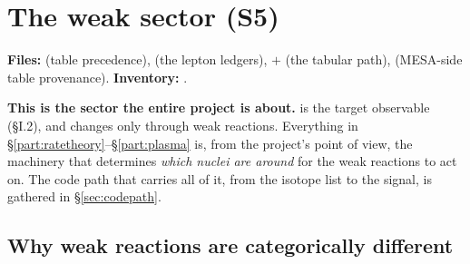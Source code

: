 %

\section{The weak sector (S5)}
\label{part:weak}

\begin{repopointer}
\textbf{Files:}  (table precedence),
 (the lepton ledgers),  $+$
 (the tabular path),  (MESA-side
table provenance). \quad
\textbf{Inventory:} .
\end{repopointer}

\textbf{This is the sector the entire project is about.} \Ye{} is the target
observable (\S I.2), and \Ye{} changes only through weak reactions. Everything
in \S\ref{part:ratetheory}--\S\ref{part:plasma} is, from the project's point of
view, the machinery that determines \emph{which nuclei are around} for the weak
reactions to act on. The code path that carries all of it, from the isotope
list to the \Ye{} signal, is gathered in \S\ref{sec:codepath}.

\subsection{Why weak reactions are categorically different}
\label{sec:weak-different}

